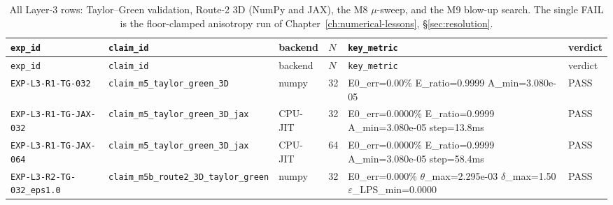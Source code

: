 {\scriptsize
\begin{longtable}{@{}>{\raggedright\arraybackslash}p{} >{\raggedright\arraybackslash}p{} l l >{\raggedright\arraybackslash}p{} l@{}}
\caption[Layer 3 experiments]{All Layer-3 rows: Taylor--Green validation, Route-2 3D (NumPy and JAX), the M8 $\mu$-sweep, and the M9 blow-up search. The single \textsf{FAIL} is the floor-clamped anisotropy run of Chapter~\ref{ch:numerical-lessons}, \S\ref{sec:resolution}.}
\label{tab:a1-layer3}\\
\toprule
\texttt{exp\_id} & \texttt{claim\_id} & backend & $N$ & \texttt{key\_metric} & verdict\\
\midrule
\endfirsthead
\toprule
\texttt{exp\_id} & \texttt{claim\_id} & backend & $N$ & \texttt{key\_metric} & verdict\\
\midrule
\endhead
\bottomrule
\endfoot
\texttt{EXP-\allowbreak{}L3-\allowbreak{}R1-\allowbreak{}TG-\allowbreak{}032} & \texttt{claim\_\allowbreak{}m5\_\allowbreak{}taylor\_\allowbreak{}green\_\allowbreak{}3D} & numpy & 32 & E0\_\allowbreak{}err=\allowbreak{}0.00\%  E\_\allowbreak{}ratio=\allowbreak{}0.9999  A\_\allowbreak{}min=\allowbreak{}3.080e-05 & \textsf{PASS}\\
\texttt{EXP-\allowbreak{}L3-\allowbreak{}R1-\allowbreak{}TG-\allowbreak{}JAX-\allowbreak{}032} & \texttt{claim\_\allowbreak{}m5\_\allowbreak{}taylor\_\allowbreak{}green\_\allowbreak{}3D\_\allowbreak{}jax} & CPU-\allowbreak{}JIT & 32 & E0\_\allowbreak{}err=\allowbreak{}0.0000\%  E\_\allowbreak{}ratio=\allowbreak{}0.9999  A\_\allowbreak{}min=\allowbreak{}3.080e-05  step=\allowbreak{}13.8ms & \textsf{PASS}\\
\texttt{EXP-\allowbreak{}L3-\allowbreak{}R1-\allowbreak{}TG-\allowbreak{}JAX-\allowbreak{}064} & \texttt{claim\_\allowbreak{}m5\_\allowbreak{}taylor\_\allowbreak{}green\_\allowbreak{}3D\_\allowbreak{}jax} & CPU-\allowbreak{}JIT & 64 & E0\_\allowbreak{}err=\allowbreak{}0.0000\%  E\_\allowbreak{}ratio=\allowbreak{}0.9999  A\_\allowbreak{}min=\allowbreak{}3.080e-05  step=\allowbreak{}58.4ms & \textsf{PASS}\\
\texttt{EXP-\allowbreak{}L3-\allowbreak{}R2-\allowbreak{}TG-\allowbreak{}032\_\allowbreak{}eps1.0} & \texttt{claim\_\allowbreak{}m5b\_\allowbreak{}route2\_\allowbreak{}3D\_\allowbreak{}taylor\_\allowbreak{}green} & numpy & 32 & E0\_\allowbreak{}err=\allowbreak{}0.000\%  $\theta$\_\allowbreak{}max=\allowbreak{}2.295e-03  $\delta$\_\allowbreak{}max=\allowbreak{}1.50  $\varepsilon$\_\allowbreak{}LPS\_\allowbreak{}min=\allowbreak{}0.0000 & \textsf{PASS}\\

\end{longtable}}
